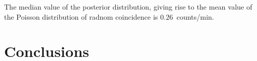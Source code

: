 The median value of the posterior distribution, giving rise to the mean value of the Poisson distribution of radnom coincidence is $0.26$~counts/min.


\section{Conclusions}\label{sec:HS_14008_conclusion}
